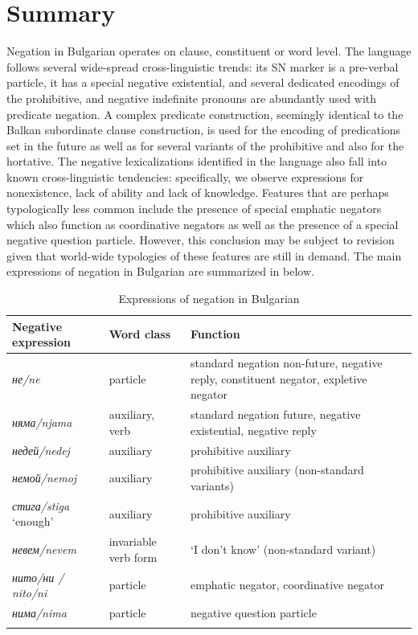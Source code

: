 \documentclass[output=paper,colorlinks=true, citecolor=brown]{langscibook}
\begin{document}
\section{Summary}
Negation in Bulgarian operates on clause, constituent or word level. The language follows several wide-spread cross-linguistic trends: its SN marker is a pre-verbal particle, it has a special negative existential, and several dedicated encodings of the prohibitive, and negative indefinite pronouns are abundantly used with predicate negation. A complex predicate construction, seemingly identical to the Balkan subordinate clause construction, is used for the encoding of predications set in the future as well as for several variants of the prohibitive and also for the hortative. The negative lexicalizations identified in the language also fall into known cross-linguistic tendencies: specifically, we observe expressions for nonexistence, lack of ability and lack of knowledge. Features that are  perhaps typologically less common include the presence of special emphatic negators which also function as coordinative negators as well as the presence of a special negative question particle. However, this conclusion may be subject to revision given that world-wide typologies of these features are still in demand. The main expressions of negation in Bulgarian are summarized in  below.

\begin{table}
 \small
    \begin{tabularx}{\textwidth}{llQ}
        \lsptoprule
        \textbf{Negative expression} & \textbf{Word class} & \textbf{Function}\\
        \midrule
        \textit{не/ne}  & particle & standard negation non-future, negative reply, constituent negator, expletive negator\\
        \textit{няма/njama}  & auxiliary, verb & standard negation future, negative existential, negative reply\\
        \textit{недей/nedej}  & auxiliary & prohibitive auxiliary\\
        \textit{немой/nemoj}  & auxiliary & prohibitive auxiliary (non-standard variants) \\
        \textit{стига/stiga} `enough'  & auxiliary & prohibitive auxiliary\\
        \textit{невем/nevem}  & invariable verb form & `I don't know' (non-standard variant)\\
        \textit{нито/ни / nito/ni}  & particle & emphatic negator, coordinative negator\\
        \textit{нима/nima}  & particle & negative question particle\\
        \lspbottomrule
    \end{tabularx}
    \caption{Expressions of negation in Bulgarian}
    \label{tab:bul:negsummary}
\end{table}
\end{document}
